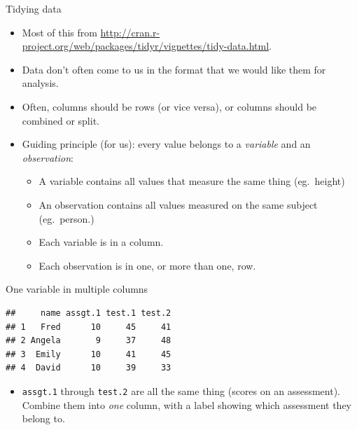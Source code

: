 \begin{frame}[fragile]{Tidying data}
  
  \begin{itemize}
  \item Most of this from
    \url{http://cran.r-project.org/web/packages/tidyr/vignettes/tidy-data.html}. 
  \item Data don't often come to us in the format that we would like
    them for analysis.
  \item Often, columns should be rows (or vice versa), or columns
    should be combined or split.
  \item Guiding principle (for us): every value belongs to a \emph{variable}
    and an \emph{observation}:
    \begin{itemize}
    \item     A variable contains all values that
    measure the same thing (eg.\ height)
  \item An observation contains all values measured on the same
    subject (eg.\ person.)
  \item Each variable is in a column.
  \item Each observation is in one, or more than one, row.
    \end{itemize}
    
  \end{itemize}
  
\end{frame}

\begin{frame}[fragile]{One variable in multiple columns}
\begin{knitrout}
\color{fgcolor}\begin{kframe}
\begin{alltt}
\hlkwb{=}\hlstd{(}\hlstd{,}
\end{alltt}
\begin{verbatim}
##     name assgt.1 test.1 test.2
## 1   Fred      10     45     41
## 2 Angela       9     37     48
## 3  Emily      10     41     45
## 4  David      10     39     33
\end{verbatim}
\end{kframe}
\end{knitrout}

\begin{itemize}
\item \texttt{assgt.1} through \texttt{test.2} are all the same thing
  (scores on an assessment). Combine them into \emph{one} column, with
  a label showing which assessment they belong to. 
   
\end{itemize}
\end{frame}

